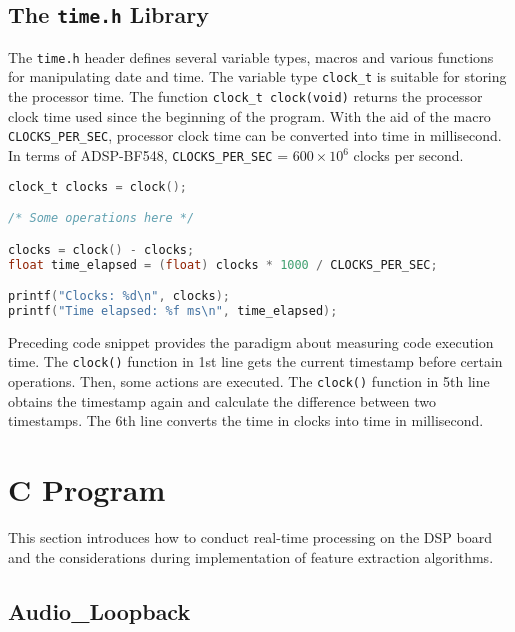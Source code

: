 \subsection{The \texttt{time.h} Library}

The \texttt{time.h} header defines several variable types, macros and various functions for manipulating date and time. The variable type \texttt{clock\_t} is suitable for storing the processor time. The function \texttt{clock\_t clock(void)} returns the processor clock time used since the beginning of the program. With the aid of the macro \texttt{CLOCKS\_PER\_SEC}, processor clock time can be converted into time in millisecond. In terms of ADSP-BF548, \texttt{CLOCKS\_PER\_SEC} = $600 \times 10^6$ clocks per second.

\begin{lstlisting}[language={C}, stepnumber=1]
clock_t clocks = clock();

/* Some operations here */

clocks = clock() - clocks;
float time_elapsed = (float) clocks * 1000 / CLOCKS_PER_SEC;

printf("Clocks: %d\n", clocks);
printf("Time elapsed: %f ms\n", time_elapsed);
\end{lstlisting}

Preceding code snippet provides the paradigm about measuring code execution time. The \texttt{clock()} function in 1st line gets the current timestamp before certain operations. Then, some actions are executed. The \texttt{clock()} function in 5th line obtains the timestamp again and calculate the difference between two timestamps. The 6th line converts the time in clocks into time in millisecond.


\section{C Program}
\label{section:c_program}

This section introduces how to conduct real-time processing on the DSP board and the considerations during implementation of feature extraction algorithms. 

\subsection{Audio\_Loopback}

